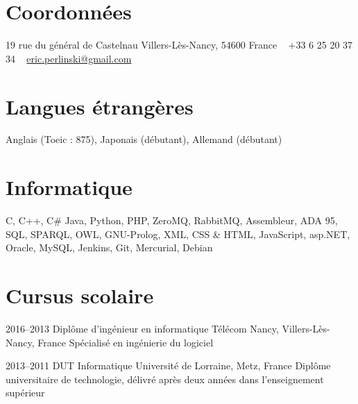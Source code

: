 \documentclass[]{cv_french} %
\begin{document}

\begin{aside} %
\section{Coordonnées}
19 rue du général de Castelnau
Villers-Lès-Nancy, 54600
France
~
+33 6 25 20 37 34
~
\href{mailto:eric.perlinski@telecomnancy.net}{eric.perlinski@gmail.com}
\section{Langues étrangères}
Anglais (Toeic : 875), 
Japonais (débutant),
Allemand (débutant)
\section{Informatique}
C, C++, C\#
Java, Python, PHP,
ZeroMQ, RabbitMQ,
Assembleur, ADA 95,
SQL, SPARQL, OWL,
GNU-Prolog,
XML, CSS \& HTML,
JavaScript, asp.NET,
Oracle, MySQL, Jenkins,
Git, Mercurial, Debian
\end{aside}

\section{Cursus scolaire}

\begin{entrylist}


\entry
{2016--2013}
{Diplôme d'ingénieur en informatique}
{Télécom Nancy, Villers-Lès-Nancy, France}
{Spécialisé en ingénierie du logiciel}


\entry
{2013--2011}
{DUT Informatique}
{Université de Lorraine, Metz, France}
{Diplôme universitaire de technologie, délivré après deux années dans l'enseignement supérieur}


\end{entrylist}
\end{document}
